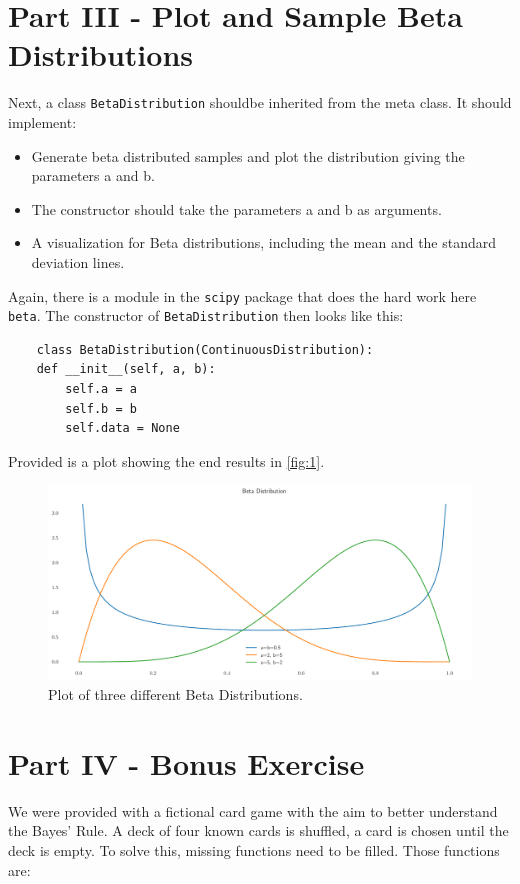 \documentclass{CPSReport}
\begin{document}
\section{Part III - Plot and Sample Beta Distributions}
Next, a class \texttt{BetaDistribution} shouldbe inherited from the meta class. It should implement:

\begin{itemize}
    \item Generate beta distributed samples and plot the distribution giving the parameters a and b.
    \item The constructor should take the parameters a and b as arguments.
    \item A visualization for Beta distributions, including the mean and the standard deviation lines.
\end{itemize}

Again, there is a module in the \texttt{scipy} package that does the hard work here \texttt{beta}.
The constructor of \texttt{BetaDistribution} then looks like this:

\begin{verbatim}
    class BetaDistribution(ContinuousDistribution):
    def __init__(self, a, b):
        self.a = a
        self.b = b
        self.data = None
\end{verbatim}

Provided is a plot showing the end results in \autoref{fig:1}.

\begin{figure}[ht]
    \begin{center}
        \includegraphics[width=1\linewidth]{../beta.pdf}
    \end{center}
    \caption{Plot of three different Beta Distributions.}
    \label{fig:1}
\end{figure}

\section{Part IV - Bonus Exercise}
We were provided with a fictional card game with the aim to better understand the Bayes' Rule. A deck of four known cards is shuffled, a card is chosen until the deck is empty. To solve this, missing functions need to be filled.
Those functions are:
\end{document}
